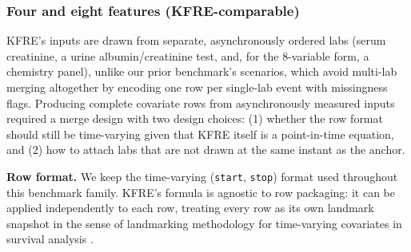 \documentclass[10pt,letterpaper]{article}
\begin{document}
\subsubsection*{Four and eight features (KFRE-comparable)}
KFRE's inputs are drawn from separate, asynchronously ordered labs (serum creatinine, a urine albumin/creatinine test, and, for the 8-variable form, a chemistry panel), unlike our prior benchmark's scenarios, which avoid multi-lab merging altogether by encoding one row per single-lab event with missingness flags. Producing complete covariate rows from asynchronously measured inputs required a merge design with two design choices: (1) whether the row format should still be time-varying given that KFRE itself is a point-in-time equation, and (2) how to attach labs that are not drawn at the same instant as the anchor.

\textbf{Row format.} We keep the time-varying (\texttt{start}, \texttt{stop}) format used throughout this benchmark family. KFRE's formula is agnostic to row packaging: it can be applied independently to each row, treating every row as its own landmark snapshot in the sense of landmarking methodology for time-varying covariates in survival analysis \cite{vanhouwelingen2007landmarking,putter2022landmarking2}.
\end{document}
